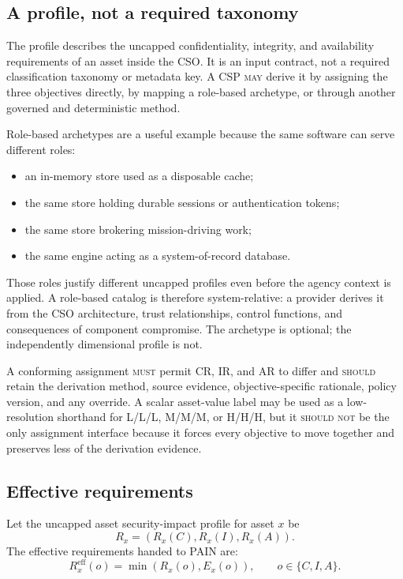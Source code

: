 \documentclass[11pt]{article}
\newcommand{\rfckw}[1]{\textsc{#1}}
\begin{document}
\subsection{A profile, not a required taxonomy}

The profile describes the uncapped confidentiality, integrity, and availability
requirements of an asset inside the CSO. It is an input contract, not a required
classification taxonomy or metadata key. A CSP \rfckw{may} derive it by assigning
the three objectives directly, by mapping a role-based archetype, or through
another governed and deterministic method.

Role-based archetypes are a useful example because the same software can serve
different roles:

\begin{itemize}[leftmargin=1.5em]
\item an in-memory store used as a disposable cache;
\item the same store holding durable sessions or authentication tokens;
\item the same store brokering mission-driving work;
\item the same engine acting as a system-of-record database.
\end{itemize}

Those roles justify different uncapped profiles even before the agency context is
applied. A role-based catalog is therefore system-relative: a provider derives it
from the CSO architecture, trust relationships, control functions, and consequences
of component compromise. The archetype is optional; the independently dimensional
profile is not.

A conforming assignment \rfckw{must} permit CR, IR, and AR to differ and
\rfckw{should} retain the derivation method, source evidence, objective-specific
rationale, policy version, and any override. A scalar asset-value label may be used
as a low-resolution shorthand for L/L/L, M/M/M, or H/H/H, but it
\rfckw{should not} be the only assignment interface because it forces every
objective to move together and preserves less of the derivation evidence.

\subsection{Effective requirements}

Let the uncapped asset security-impact profile for asset $x$ be
\[
R_x=(R_x(C),R_x(I),R_x(A)).
\]
The effective requirements handed to PAIN are:
\begin{equation}
R_x^{\mathrm{eff}}(o)=\min(R_x(o),E_x(o)),
\qquad o\in\{C,I,A\}.
\label{eq:effective}
\end{equation}
\end{document}
